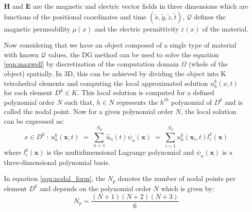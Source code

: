 \textbf{H} and \textbf{E} are the magnetic and electric vector fields in
three dimensions which are functions of the positional coordinates and time
$ (\tilde{x},\tilde{y}, \tilde{z}, \tilde{t}) $, $ \mathcal{Q} $ defines the magnetic permeability
$ \mu(x) $ and the electric permittivity $ \varepsilon(x) $ of the material.

Now considering that we have an object composed of a single type of material with known $ \mathcal{Q} $
values, the DG method can be used to solve the equation \ref{eqn:maxwell} by discretization of the
computation domain $ \Omega $ (whole of the object) spatially. In 3D, this can be achieved by dividing the object
into K tetrahedral elements and computing the local approximated solution $ u_h^k(x,t) $ for
each element $ D^k \in K $. This local solution is computed for a defined polynomial order $ N $ such that,
$ h \in N $ represents the $ h^{th} $ polynomial of $ D^k $ and is called the nodal point.
Now for a given polynomial order $ N $, the local solution can be expressed \cite{hesthaven_nodal_2008} as:
\begin{equation}\label{eqn:nodal_form}
    x \in D^k \ : \ u^k_{h}(\textbf{x}, t) \; = \; \sum_{n=1}^{N_p} \hat{u}_n(t) \psi_{n}(\textbf{x}) \; = \; \sum_{i=1}^{N_p} u^k_{h}(\textbf{x}_{i}, t) l^k_{i}(\textbf{x})
\end{equation}
where $ l^k_{i}(\textbf{x}) $ is the multidimensional Lagrange polynomial and $ \psi_{n}(\textbf{x}) $
is a three-dimensional polynomial basis.

In equation \ref{eqn:nodal_form}, the $ N_p $ denotes the number of nodal points per element $ D^k $
and depends on the polynomial order $ N $ which is given by:
\begin{equation}\label{eqn:nprelation}
    N_p = \frac{(N+1)(N+2)(N+3)}{6}
\end{equation}

